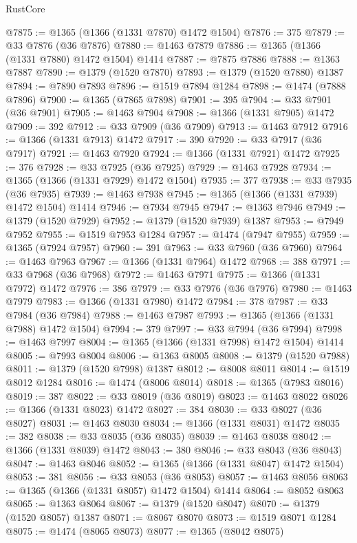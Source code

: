\begin{lexlean}{RustCore}
\begin{coremodule}
@7875 := @1365 (@1366 (@1331 @7870) @1472 @1504)
@7876 := 375
@7879 := @33 @7876 (@36 @7876)
@7880 := @1463 @7879
@7886 := @1365 (@1366 (@1331 @7880) @1472 @1504) @1414
@7887 := @7875 @7886
@7888 := @1363 @7887
@7890 := @1379 (@1520 @7870)
@7893 := @1379 (@1520 @7880) @1387
@7894 := @7890 @7893
@7896 := @1519 @7894 @1284
@7898 := @1474 (@7888 @7896)
@7900 := @1365 (@7865 @7898)
@7901 := 395
@7904 := @33 @7901 (@36 @7901)
@7905 := @1463 @7904
@7908 := @1366 (@1331 @7905) @1472
@7909 := 392
@7912 := @33 @7909 (@36 @7909)
@7913 := @1463 @7912
@7916 := @1366 (@1331 @7913) @1472
@7917 := 390
@7920 := @33 @7917 (@36 @7917)
@7921 := @1463 @7920
@7924 := @1366 (@1331 @7921) @1472
@7925 := 376
@7928 := @33 @7925 (@36 @7925)
@7929 := @1463 @7928
@7934 := @1365 (@1366 (@1331 @7929) @1472 @1504)
@7935 := 377
@7938 := @33 @7935 (@36 @7935)
@7939 := @1463 @7938
@7945 := @1365 (@1366 (@1331 @7939) @1472 @1504) @1414
@7946 := @7934 @7945
@7947 := @1363 @7946
@7949 := @1379 (@1520 @7929)
@7952 := @1379 (@1520 @7939) @1387
@7953 := @7949 @7952
@7955 := @1519 @7953 @1284
@7957 := @1474 (@7947 @7955)
@7959 := @1365 (@7924 @7957)
@7960 := 391
@7963 := @33 @7960 (@36 @7960)
@7964 := @1463 @7963
@7967 := @1366 (@1331 @7964) @1472
@7968 := 388
@7971 := @33 @7968 (@36 @7968)
@7972 := @1463 @7971
@7975 := @1366 (@1331 @7972) @1472
@7976 := 386
@7979 := @33 @7976 (@36 @7976)
@7980 := @1463 @7979
@7983 := @1366 (@1331 @7980) @1472
@7984 := 378
@7987 := @33 @7984 (@36 @7984)
@7988 := @1463 @7987
@7993 := @1365 (@1366 (@1331 @7988) @1472 @1504)
@7994 := 379
@7997 := @33 @7994 (@36 @7994)
@7998 := @1463 @7997
@8004 := @1365 (@1366 (@1331 @7998) @1472 @1504) @1414
@8005 := @7993 @8004
@8006 := @1363 @8005
@8008 := @1379 (@1520 @7988)
@8011 := @1379 (@1520 @7998) @1387
@8012 := @8008 @8011
@8014 := @1519 @8012 @1284
@8016 := @1474 (@8006 @8014)
@8018 := @1365 (@7983 @8016)
@8019 := 387
@8022 := @33 @8019 (@36 @8019)
@8023 := @1463 @8022
@8026 := @1366 (@1331 @8023) @1472
@8027 := 384
@8030 := @33 @8027 (@36 @8027)
@8031 := @1463 @8030
@8034 := @1366 (@1331 @8031) @1472
@8035 := 382
@8038 := @33 @8035 (@36 @8035)
@8039 := @1463 @8038
@8042 := @1366 (@1331 @8039) @1472
@8043 := 380
@8046 := @33 @8043 (@36 @8043)
@8047 := @1463 @8046
@8052 := @1365 (@1366 (@1331 @8047) @1472 @1504)
@8053 := 381
@8056 := @33 @8053 (@36 @8053)
@8057 := @1463 @8056
@8063 := @1365 (@1366 (@1331 @8057) @1472 @1504) @1414
@8064 := @8052 @8063
@8065 := @1363 @8064
@8067 := @1379 (@1520 @8047)
@8070 := @1379 (@1520 @8057) @1387
@8071 := @8067 @8070
@8073 := @1519 @8071 @1284
@8075 := @1474 (@8065 @8073)
@8077 := @1365 (@8042 @8075)

\end{coremodule}
\end{lexlean}

